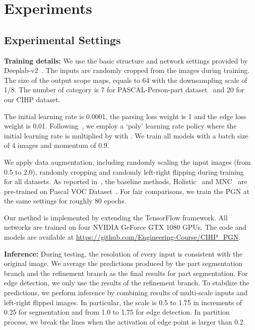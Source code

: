 \documentclass[runningheads]{llncs}
\begin{document}
\section{Experiments}


\subsection{Experimental Settings}


\textbf{Training details:}
We use the basic structure and network settings provided by Deeplab-v2~\cite{chen2016deeplab}. The  inputs are randomly cropped from the images during training. The size of the output scope maps,  equals to 64 with the downsampling scale of 1/8. The number of category  is 7 for PASCAL-Person-part dataset~\cite{chen2014detect} and 20 for our CIHP dataset.


The initial learning rate is 0.0001, the parsing loss weight  is 1 and the edge loss weight  is 0.01. Following~\cite{chen2017rethinking}, we employ a `poly' learning rate policy where the initial learning rate is multiplied by 
 with . We train all models with a batch size of 4 images and momentum of 0.9.

We apply data augmentation, including randomly scaling the input images (from 0.5 to 2.0), randomly cropping and randomly left-right flipping during training for all datasets. As reported in~\cite{li2017holistic}, the baseline methods, Holistic~\cite{li2017holistic} and MNC~\cite{Dai_2016_CVPR} are pre-trained on Pascal VOC Dataset~\cite{everingham2010pascal}. For fair comparisons, we train the PGN at the same settings for roughly 80 epochs.

Our method is implemented by extending the TensorFlow framework. All networks are trained on four NVIDIA GeForce GTX 1080 GPUs. The code and models are available at \url{https://github.com/Engineering-Course/CIHP_PGN}.

\textbf{Inference:}
During testing, the resolution of every input is consistent with the original image. We average the predictions produced by the part segmentation branch and the refinement branch as the final results for part segmentation. For edge detection, we only use the results of the refinement branch. To stabilize the predictions, we perform inference by combining results of multi-scale inputs and left-right flipped images. In particular, the scale is 0.5 to 1.75 in increments of 0.25 for segmentation and from 1.0 to 1.75 for edge detection. In partition process, we break the lines when the activation of edge point is larger than 0.2.
\end{document}
